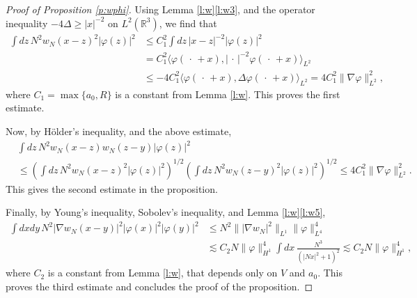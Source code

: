 \documentclass[11pt,a4paper]{scrartcl}
\newcommand{\R}{\mathds{R}}
\begin{document}
\begin{proof}[Proof of Proposition \ref{p:wphi}]
  Using Lemma \ref{l:w}\ref{l:w3}, and the operator inequality $-4 \Delta \ge
  |x|^{-2}$ on $L^2(\R^3)$, we find that
  \begin{align*}
    \int dz \, N^2 w_N(x-z)^2 |\varphi(z)|^2 & \le C_1^2 \int dz \, |x-z|^{-2}
    |\varphi(z)|^2 \\
    & = C_1^2 \langle \varphi(\,\cdot\,+x), |\,\cdot\,|^{-2}
    \varphi(\,\cdot\,+x) \rangle_{L^2} \\
    & \le -4 C_1^2 \langle \varphi(\,\cdot\,+x), \Delta \varphi(\,\cdot\,+x)
    \rangle_{L^2} = 4 C_1^2 \| \nabla \varphi \|_{L^2}^2,
  \end{align*}
  where $C_1 = \max\{a_0, R\}$ is a constant from Lemma \ref{l:w}. This proves
  the first estimate.


  Now, by H\"older's inequality, and the above estimate,
  \begin{align*}
    & \int dz \, N^2 w_N(x-z) w_N(z-y) |\varphi(z)|^2 \\
    & \le \left( \int dz \, N^2 w_N(x-z)^2 |\varphi(z)|^2 \right)^{1/2} \left(
    \int dz \, N^2 w_N(z-y)^2 |\varphi(z)|^2 \right)^{1/2} \le 4C_1^2 \|
    \nabla \varphi \|_{L^2}^2.
  \end{align*}
  This gives the second estimate in the proposition.


  Finally, by Young's inequality, Sobolev's inequality, and Lemma
  \ref{l:w}\ref{l:w5},
  \begin{align*}
    \int dx dy \, N^2 |\nabla w_N(x-y)|^2 |\varphi(x)|^2 |\varphi(y)|^2 & \le
    N^2 \| | \nabla w_N|^2 \|_{L^1} \| \varphi \|_{L^4}^4 \\
    & \apprle C_2 N \| \varphi \|_{H^1}^4 \int dx \, \frac{N^3}{(|Nx|^2 +
    1)^2} \apprle C_2 N \| \varphi \|_{H^1}^4,
  \end{align*}
  where $C_2$ is a constant from Lemma \ref{l:w}, that depends only on $V$ and
  $a_0$. This proves the third estimate and concludes the proof of the
  proposition.
\end{proof}
\end{document}
